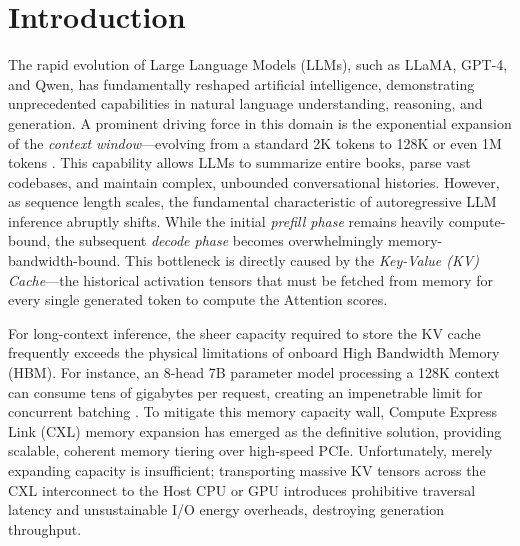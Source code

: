 \documentclass[10pt,conference]{IEEEtran}
\begin{document}
\section{Introduction}

The rapid evolution of Large Language Models (LLMs), such as LLaMA, GPT-4, and Qwen, has fundamentally reshaped artificial intelligence, demonstrating unprecedented capabilities in natural language understanding, reasoning, and generation. A prominent driving force in this domain is the exponential expansion of the \textit{context window}—evolving from a standard 2K tokens to 128K or even 1M tokens \cite{llm_context}. This capability allows LLMs to summarize entire books, parse vast codebases, and maintain complex, unbounded conversational histories. However, as sequence length scales, the fundamental characteristic of autoregressive LLM inference abruptly shifts. While the initial \textit{prefill phase} remains heavily compute-bound, the subsequent \textit{decode phase} becomes overwhelmingly memory-bandwidth-bound. This bottleneck is directly caused by the \textit{Key-Value (KV) Cache}—the historical activation tensors that must be fetched from memory for every single generated token to compute the Attention scores.

For long-context inference, the sheer capacity required to store the KV cache frequently exceeds the physical limitations of onboard High Bandwidth Memory (HBM). For instance, an 8-head 7B parameter model processing a 128K context can consume tens of gigabytes per request, creating an impenetrable limit for concurrent batching \cite{kv_cache_bottleneck}. To mitigate this memory capacity wall, Compute Express Link (CXL) \cite{cxl_standard} memory expansion has emerged as the definitive solution, providing scalable, coherent memory tiering over high-speed PCIe. Unfortunately, merely expanding capacity is insufficient; transporting massive KV tensors across the CXL interconnect to the Host CPU or GPU introduces prohibitive traversal latency and unsustainable I/O energy overheads, destroying generation throughput.
\end{document}
